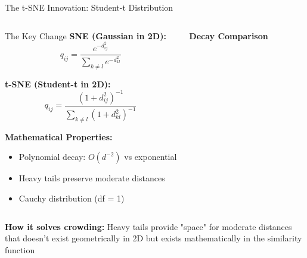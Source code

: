 \documentclass[aspectratio=169]{beamer}
\begin{document}
\begin{frame}{The t-SNE Innovation: Student-t Distribution}
\vspace{-3mm}
\begin{columns}
\begin{block}{The Key Change}
\textbf{SNE (Gaussian in 2D):}
$$q_{ij} = \frac{e^{-d_{ij}^2}}{\sum_{k \neq l} e^{-d_{kl}^2}}$$

\textbf{t-SNE (Student-t in 2D):}
$$q_{ij} = \frac{(1 + d_{ij}^2)^{-1}}{\sum_{k \neq l} (1 + d_{kl}^2)^{-1}}$$

\vspace{1mm}
\textbf{Mathematical Properties:}
\begin{itemize}
\item Polynomial decay: $O(d^{-2})$ vs exponential
\item Heavy tails preserve moderate distances
\item Cauchy distribution (df = 1)
\end{itemize}
\end{block}

\begin{center}
\textbf{Decay Comparison}\\[2mm]
\end{center}
\end{columns}

\vspace{3mm}
\begin{center}
\colorbox{green!20}{\parbox{0.9\textwidth}{\centering
\textbf{How it solves crowding:} Heavy tails provide "space" for moderate distances\\
that doesn't exist geometrically in 2D but exists mathematically in the similarity function}}
\end{center}
\end{frame}
\end{document}
